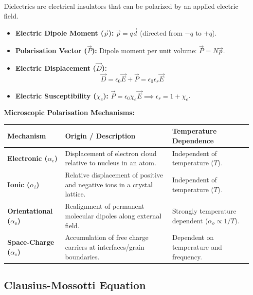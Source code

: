 \documentclass[12pt,a4paper]{article}
\begin{document}
Dielectrics are electrical insulators that can be polarized by an applied electric field.

\begin{tcolorbox}[formulabox, title={\textbf{Fundamental Dielectric Relations}}]
\begin{itemize}[leftmargin=*, itemsep=3pt]
  \item \textbf{Electric Dipole Moment ($\vec{p}$):} $\vec{p} = q \vec{d}$ (directed from $-q$ to $+q$).
  \item \textbf{Polarisation Vector ($\vec{P}$):} Dipole moment per unit volume: $\vec{P} = N \vec{p}$.
  \item \textbf{Electric Displacement ($\vec{D}$):}
  \begin{equation}
  \vec{D} = \epsilon_0 \vec{E} + \vec{P} = \epsilon_0 \epsilon_r \vec{E}
  \end{equation}
  \item \textbf{Electric Susceptibility ($\chi_e$):} $\vec{P} = \epsilon_0 \chi_e \vec{E} \implies \epsilon_r = 1 + \chi_e$.
\end{itemize}
\end{tcolorbox}

\textbf{Microscopic Polarisation Mechanisms:}\par\vspace{6pt}\noindent
\begin{tabularx}{\linewidth}{|B{3.2cm}|Y|Y|}
\hline
\textbf{Mechanism} & \textbf{Origin / Description} & \textbf{Temperature Dependence} \\
\hline
\textbf{Electronic ($\alpha_e$)} & Displacement of electron cloud relative to nucleus in an atom. & Independent of temperature ($T$). \\
\hline
\textbf{Ionic ($\alpha_i$)} & Relative displacement of positive and negative ions in a crystal lattice. & Independent of temperature ($T$). \\
\hline
\textbf{Orientational ($\alpha_o$)} & Realignment of permanent molecular dipoles along external field. & Strongly temperature dependent ($\alpha_o \propto 1/T$). \\
\hline
\textbf{Space-Charge ($\alpha_s$)} & Accumulation of free charge carriers at interfaces/grain boundaries. & Dependent on temperature and frequency. \\
\hline
\end{tabularx}

\subsection{Clausius-Mossotti Equation}
\end{document}

